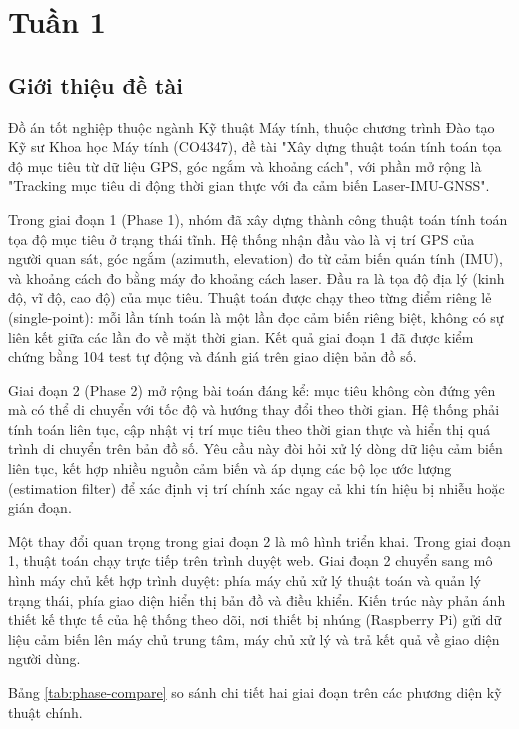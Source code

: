\section{Tuần 1}

\subsection{Giới thiệu đề tài}

\hspace{0.5cm} Đồ án tốt nghiệp thuộc ngành Kỹ thuật Máy tính, thuộc chương trình Đào tạo Kỹ sư Khoa học Máy tính (CO4347), đề tài "Xây dựng thuật toán tính toán tọa độ mục tiêu từ dữ liệu GPS, góc ngắm và khoảng cách", với phần mở rộng là "Tracking mục tiêu di động thời gian thực với đa cảm biến Laser-IMU-GNSS".

Trong giai đoạn 1 (Phase 1), nhóm đã xây dựng thành công thuật toán tính toán tọa độ mục tiêu ở trạng thái tĩnh. Hệ thống nhận đầu vào là vị trí GPS của người quan sát, góc ngắm (azimuth, elevation) đo từ cảm biến quán tính (IMU), và khoảng cách đo bằng máy đo khoảng cách laser. Đầu ra là tọa độ địa lý (kinh độ, vĩ độ, cao độ) của mục tiêu. Thuật toán được chạy theo từng điểm riêng lẻ (single-point): mỗi lần tính toán là một lần đọc cảm biến riêng biệt, không có sự liên kết giữa các lần đo về mặt thời gian. Kết quả giai đoạn 1 đã được kiểm chứng bằng 104 test tự động và đánh giá trên giao diện bản đồ số.

Giai đoạn 2 (Phase 2) mở rộng bài toán đáng kể: mục tiêu không còn đứng yên mà có thể di chuyển với tốc độ và hướng thay đổi theo thời gian. Hệ thống phải tính toán liên tục, cập nhật vị trí mục tiêu theo thời gian thực và hiển thị quá trình di chuyển trên bản đồ số. Yêu cầu này đòi hỏi xử lý dòng dữ liệu cảm biến liên tục, kết hợp nhiều nguồn cảm biến và áp dụng các bộ lọc ước lượng (estimation filter) để xác định vị trí chính xác ngay cả khi tín hiệu bị nhiễu hoặc gián đoạn.

Một thay đổi quan trọng trong giai đoạn 2 là mô hình triển khai. Trong giai đoạn 1, thuật toán chạy trực tiếp trên trình duyệt web. Giai đoạn 2 chuyển sang mô hình máy chủ kết hợp trình duyệt: phía máy chủ xử lý thuật toán và quản lý trạng thái, phía giao diện hiển thị bản đồ và điều khiển. Kiến trúc này phản ánh thiết kế thực tế của hệ thống theo dõi, nơi thiết bị nhúng (Raspberry Pi) gửi dữ liệu cảm biến lên máy chủ trung tâm, máy chủ xử lý và trả kết quả về giao diện người dùng.

Bảng \ref{tab:phase-compare} so sánh chi tiết hai giai đoạn trên các phương diện kỹ thuật chính.

